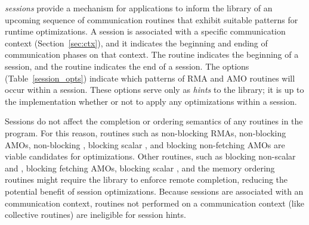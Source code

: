 \openshmem \emph{sessions} provide a mechanism for applications to inform the
\openshmem library of an upcoming sequence of communication routines that
exhibit suitable patterns for runtime optimizations.
A session is associated with a specific \openshmem communication context
(Section~\ref{sec:ctx}), and it indicates the beginning and ending of
communication phases on that context.
The  routine indicates the beginning of a session,
and the  routine indicates the end of a session.
The  options (Table~\ref{session_opts}) indicate
which patterns of \openshmem RMA and AMO routines will occur within a session.
These options serve only as \textit{hints} to the library; it is up to the
implementation whether or not to apply any optimizations within a session.

Sessions do not affect the completion or ordering semantics of any \openshmem
routines in the program.
For this reason, routines such as non-blocking RMAs, non-blocking AMOs,
non-blocking , blocking scalar , and blocking
non-fetching AMOs are viable candidates for optimizations.
Other routines, such as blocking non-scalar  and , blocking
fetching AMOs, blocking scalar , and the memory ordering routines
might require the library to enforce remote completion, reducing the potential
benefit of session optimizations.
Because sessions are associated with an \openshmem communication context,
routines not performed on a communication context (like collective routines)
are ineligible for session hints.
